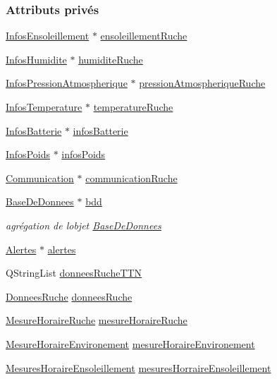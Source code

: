 \subsubsection*{Attributs privés}
\begin{DoxyCompactItemize}
\item 
\hyperlink{class_infos_ensoleillement}{Infos\+Ensoleillement} $\ast$ \hyperlink{class_ruche_a197003ecff4f029885c7d38569a68d49}{ensoleillement\+Ruche}
\item 
\hyperlink{class_infos_humidite}{Infos\+Humidite} $\ast$ \hyperlink{class_ruche_acb380928928e693a1933c4cf607ddf80}{humidite\+Ruche}
\item 
\hyperlink{class_infos_pression_atmospherique}{Infos\+Pression\+Atmospherique} $\ast$ \hyperlink{class_ruche_a06efa82900dc7e31ed67c826d3157ae0}{pression\+Atmospherique\+Ruche}
\item 
\hyperlink{class_infos_temperature}{Infos\+Temperature} $\ast$ \hyperlink{class_ruche_af721fb92f801a9b1f3ef3aa9867cf3de}{temperature\+Ruche}
\item 
\hyperlink{class_infos_batterie}{Infos\+Batterie} $\ast$ \hyperlink{class_ruche_af34340e456aff54c8d1ec433fdbe0740}{infos\+Batterie}
\item 
\hyperlink{class_infos_poids}{Infos\+Poids} $\ast$ \hyperlink{class_ruche_af3d02b62dd3d986b73b38851bb88ec77}{infos\+Poids}
\item 
\hyperlink{class_communication}{Communication} $\ast$ \hyperlink{class_ruche_a6211b7b8f43abf5eecf8a1fc2d0f037e}{communication\+Ruche}
\item 
\hyperlink{class_base_de_donnees}{Base\+De\+Donnees} $\ast$ \hyperlink{class_ruche_a8577fdedabdecd98652e338e83bb3b65}{bdd}
\begin{DoxyCompactList}\small\item\em agrégation de l\textquotesingle{}objet \hyperlink{class_base_de_donnees}{Base\+De\+Donnees} \end{DoxyCompactList}\item 
\hyperlink{class_alertes}{Alertes} $\ast$ \hyperlink{class_ruche_af07644ddce44cb5ed4286475dc0f9d46}{alertes}
\item 
Q\+String\+List \hyperlink{class_ruche_a4556832042641c08a6ef2ab9d80d771e}{donnees\+Ruche\+T\+TN}
\item 
\hyperlink{struct_donnees_ruche}{Donnees\+Ruche} \hyperlink{class_ruche_a1526bfa78f03e0710ad16f880a40c15f}{donnees\+Ruche}
\item 
\hyperlink{struct_mesure_horaire_ruche}{Mesure\+Horaire\+Ruche} \hyperlink{class_ruche_a9a68d3b7eb272e139f1532fdcbca2da3}{mesure\+Horaire\+Ruche}
\item 
\hyperlink{struct_mesure_horaire_environement}{Mesure\+Horaire\+Environement} \hyperlink{class_ruche_a73a826506110c10d9221065670985e52}{mesure\+Horaire\+Environement}
\item 
\hyperlink{struct_mesures_horaire_ensoleillement}{Mesures\+Horaire\+Ensoleillement} \hyperlink{class_ruche_a5e57df1ce7805b1ab0f6d8ef37504582}{mesures\+Horraire\+Ensoleillement}
\end{DoxyCompactItemize}


